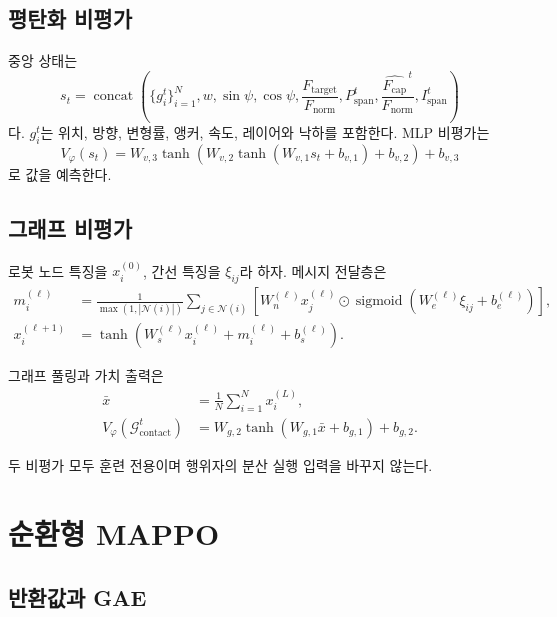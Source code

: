 \documentclass[11pt,a4paper]{article}
\newcommand{\Ftarget}{F_{\mathrm{target}}}
\newcommand{\Fcap}{F_{\mathrm{cap}}}
\newcommand{\Pspan}{P_{\mathrm{span}}}
\newcommand{\Ispan}{I_{\mathrm{span}}}
\newcommand{\Gcontact}{\mathcal{G}_{\mathrm{contact}}}
\newcommand{\concat}{\operatorname{concat}}
\newcommand{\sigmoid}{\operatorname{sigmoid}}
\begin{document}
\subsection{평탄화 비평가}

중앙 상태는
\begin{equation}
  s_t=
  \concat\left(
    \{g_i^t\}_{i=1}^N,
    w,\sin\psi,\cos\psi,
    \frac{\Ftarget}{F_{\mathrm{norm}}},
    \Pspan^t,
    \frac{\widehat{\Fcap}^{\,t}}{F_{\mathrm{norm}}},
    \Ispan^t
  \right)
\end{equation}
다. \(g_i^t\)는 위치, 방향, 변형률, 앵커, 속도, 레이어와 낙하를 포함한다. MLP 비평가는
\begin{equation}
  V_\varphi(s_t)=
  W_{v,3}\tanh\left(
    W_{v,2}\tanh(W_{v,1}s_t+b_{v,1})+b_{v,2}
  \right)+b_{v,3}
  \label{eq:mlp-critic}
\end{equation}
로 값을 예측한다.

\subsection{그래프 비평가}

로봇 노드 특징을 \(x_i^{(0)}\), 간선 특징을 \(\xi_{ij}\)라 하자. 메시지 전달층은
\begin{align}
  m_i^{(\ell)}
    &=
    \frac{1}{\max(1,|\mathcal{N}(i)|)}
    \sum_{j\in\mathcal{N}(i)}
    \left[
      W_n^{(\ell)}x_j^{(\ell)}
      \odot
      \sigmoid(W_e^{(\ell)}\xi_{ij}+b_e^{(\ell)})
    \right],\\
  x_i^{(\ell+1)}
    &=
    \tanh\left(
      W_s^{(\ell)}x_i^{(\ell)}
      +m_i^{(\ell)}
      +b_s^{(\ell)}
    \right).
  \label{eq:message-passing}
\end{align}

그래프 풀링과 가치 출력은
\begin{align}
  \bar x&=\frac{1}{N}\sum_{i=1}^Nx_i^{(L)},\\
  V_\varphi(\Gcontact^t)
    &=W_{g,2}\tanh(W_{g,1}\bar x+b_{g,1})+b_{g,2}.
  \label{eq:graph-value}
\end{align}

두 비평가 모두 훈련 전용이며 행위자의 분산 실행 입력을 바꾸지 않는다.

\section{순환형 MAPPO}

\subsection{반환값과 GAE}
\end{document}
